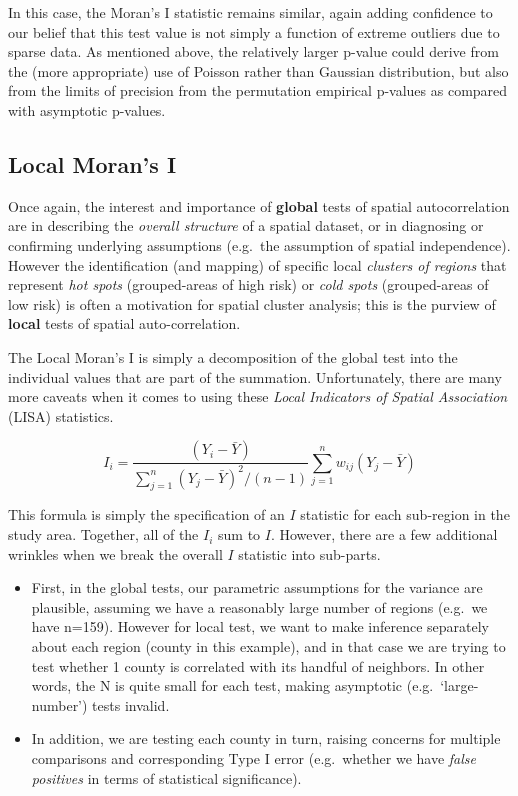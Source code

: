 \documentclass[
]{book}
\providecommand{\tightlist}{%
  \setlength{\itemsep}{0pt}\setlength{\parskip}{0pt}}
\begin{document}
In this case, the Moran's I statistic remains similar, again adding confidence to our belief that this test value is not simply a function of extreme outliers due to sparse data. As mentioned above, the relatively larger p-value could derive from the (more appropriate) use of Poisson rather than Gaussian distribution, but also from the limits of precision from the permutation empirical p-values as compared with asymptotic p-values.

\hypertarget{local-morans-i}{%
\subsection{Local Moran's I}\label{local-morans-i}}

Once again, the interest and importance of \textbf{global} tests of spatial autocorrelation are in describing the \emph{overall structure} of a spatial dataset, or in diagnosing or confirming underlying assumptions (e.g.~the assumption of spatial independence). However the identification (and mapping) of specific local \emph{clusters of regions} that represent \emph{hot spots} (grouped-areas of high risk) or \emph{cold spots} (grouped-areas of low risk) is often a motivation for spatial cluster analysis; this is the purview of \textbf{local} tests of spatial auto-correlation.

The Local Moran's I is simply a decomposition of the global test into the individual values that are part of the summation. Unfortunately, there are many more caveats when it comes to using these \emph{Local Indicators of Spatial Association} (LISA) statistics.

\[I_i = \frac{(Y_i-\bar Y)}{\sum\limits_{j=1}^{n}(Y_j-\bar Y)^2 / (n-1)} \sum\limits_{j=1}^{n}w_{ij}(Y_j-\bar Y)\]

This formula is simply the specification of an \(I\) statistic for each sub-region in the study area. Together, all of the \(I_i\) sum to \(I\). However, there are a few additional wrinkles when we break the overall \(I\) statistic into sub-parts.

\begin{itemize}
\tightlist
\item
  First, in the global tests, our parametric assumptions for the variance are plausible, assuming we have a reasonably large number of regions (e.g.~we have n=159). However for local test, we want to make inference separately about each region (county in this example), and in that case we are trying to test whether 1 county is correlated with its handful of neighbors. In other words, the N is quite small for each test, making asymptotic (e.g.~`large-number') tests invalid.
\item
  In addition, we are testing each county in turn, raising concerns for multiple comparisons and corresponding Type I error (e.g.~whether we have \emph{false positives} in terms of statistical significance).
\end{itemize}
\end{document}
